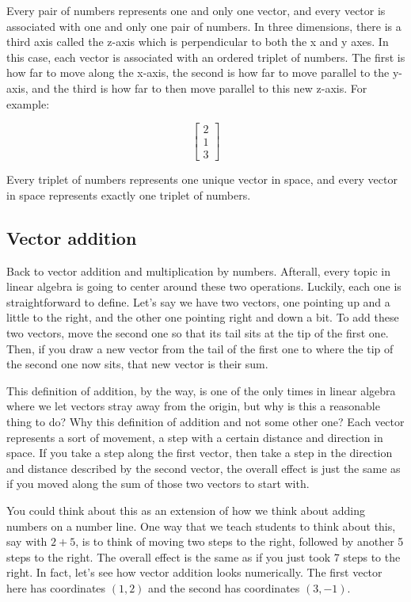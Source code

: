Every pair of numbers represents one and only one vector, and every vector is
associated with one and only one pair of numbers. In three dimensions, there is
a third axis called the z-axis which is perpendicular to both the x and y axes.
In this case, each vector is associated with an ordered triplet of numbers. The
first is how far to move along the x-axis, the second is how far to move
parallel to the y-axis, and the third is how far to then move parallel to this
new z-axis. For example:

\begin{equation*}
  \begin{bmatrix}
    2 \\
    1 \\
    3
  \end{bmatrix}
\end{equation*}

Every triplet of numbers represents one unique vector in space, and every vector
in space represents exactly one triplet of numbers.

\subsection{Vector addition}

Back to vector addition and multiplication by numbers. Afterall, every topic in
linear algebra is going to center around these two operations. Luckily, each
one is straightforward to define. Let's say we have two vectors, one pointing up
and a little to the right, and the other one pointing right and down a bit. To
add these two vectors, move the second one so that its tail sits at the tip of
the first one. Then, if you draw a new vector from the tail of the first one to
where the tip of the second one now sits, that new vector is their sum.

This definition of addition, by the way, is one of the only times in linear
algebra where we let vectors stray away from the origin, but why is this a
reasonable thing to do? Why this definition of addition and not some other one?
Each vector represents a sort of movement, a step with a certain distance and
direction in space. If you take a step along the first vector, then take a step
in the direction and distance described by the second vector, the overall effect
is just the same as if you moved along the sum of those two vectors to start
with.

You could think about this as an extension of how we think about adding numbers
on a number line. One way that we teach students to think about this, say with
$2 + 5$, is to think of moving two steps to the right, followed by another 5
steps to the right. The overall effect is the same as if you just took 7 steps
to the right. In fact, let's see how vector addition looks numerically. The
first vector here has coordinates $(1, 2)$ and the second has coordinates
$(3, -1)$.

